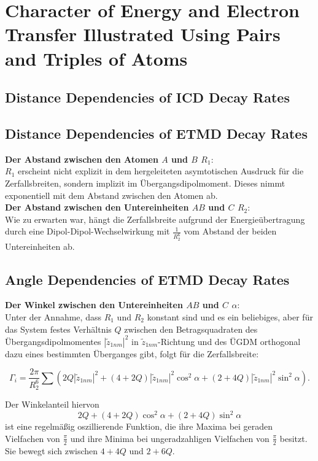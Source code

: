 \section{Character of Energy and Electron Transfer Illustrated Using Pairs and Triples of Atoms}

\subsection{Distance Dependencies of ICD Decay Rates}



\subsection{Distance Dependencies of ETMD Decay Rates}
\textbf{Der Abstand zwischen den Atomen $A$ und $B$ $R_1$}:\\
$R_1$ erscheint nicht explizit in dem hergeleiteten asymtotischen Ausdruck für die Zerfallsbreiten, sondern implizit im Übergangsdipolmoment. Dieses nimmt exponentiell mit dem Abstand zwischen den Atomen ab.\\

\textbf{Der Abstand zwischen den Untereinheiten $AB$ und $C$ $R_2$}:\\
Wie zu erwarten war, hängt die Zerfallsbreite aufgrund der Energieübertragung durch eine Dipol-Dipol-Wechselwirkung mit $\frac{1}{R_2^6}$ vom Abstand der beiden Untereinheiten ab.\\


\subsection{Angle Dependencies of ETMD Decay Rates}
\textbf{Der Winkel zwischen den Untereinheiten $AB$ und $C$ $\alpha$}:\\
Unter der Annahme, dass $R_1$ und $R_2$ konstant sind und es ein beliebiges, aber für das System festes Verhältnis $Q$ zwischen den Betragsquadraten des Übergangsdipolmomentes $|\tilde{z}_{1nm}|^2$ in $\tilde{z}_{1nm}$-Richtung und des ÜGDM orthogonal dazu eines bestimmten Überganges gibt, folgt für die Zerfallsbreite:

\begin{equation}
 \Gamma_i = \frac{2\pi}{R_2^6}\sum \left( 2Q |{\tilde{z}_{1nm}}|^2 +(4+2Q)|{\tilde{z}_{1nm}}|^2 \cos^2\alpha + (2+4Q)|{\tilde{z}_{1nm}}|^2 \sin^2\alpha \right) .
\end{equation}

Der Winkelanteil hiervon
\begin{equation}
 2Q +(4+2Q) \cos^2\alpha + (2+4Q) \sin^2\alpha
\end{equation}
ist eine regelmäßig oszillierende Funktion, die ihre Maxima bei geraden Vielfachen von $\frac \pi 2$ und ihre Minima bei ungeradzahligen Vielfachen von $\frac \pi 2$ besitzt. Sie bewegt sich zwischen $4+4Q$ und $2+6Q$.



